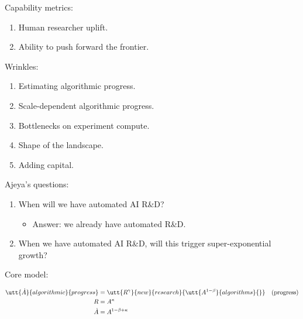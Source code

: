\documentclass[
  11pt,
  letterpaper,
  DIV=11,
  numbers=noendperiod]{scrartcl}
\providecommand{\tightlist}{%
  \setlength{\itemsep}{0pt}\setlength{\parskip}{0pt}}
\begin{document}
Capability metrics:

\begin{enumerate}
\def\labelenumi{\arabic{enumi}.}
\tightlist
\item
  Human researcher uplift.
\item
  Ability to push forward the frontier.
\end{enumerate}

Wrinkles:

\begin{enumerate}
\def\labelenumi{\arabic{enumi}.}
\tightlist
\item
  Estimating algorithmic progress.
\item
  Scale-dependent algorithmic progress.
\item
  Bottlenecks on experiment compute.
\item
  Shape of the landscape.
\item
  Adding capital.
\end{enumerate}

Ajeya's questions:

\begin{enumerate}
\def\labelenumi{\arabic{enumi}.}
\tightlist
\item
  When will we have automated AI R\&D?

  \begin{itemize}
  \tightlist
  \item
    Answer: we already have automated R\&D.
  \end{itemize}
\item
  When we have automated AI R\&D, will this trigger super-exponential
  growth?
\end{enumerate}

Core model:

\[\begin{aligned}
    \utt{\dot{A}}{algorithmic}{progress}
        &=\utt{R^{\gamma}}{new}{research}
            {\utt{A^{1-\beta}}{algorithms}{}}
        && \text{(progress)}\\
    R&=A^{\kappa}
        && \text{}\\
    \dot{A}&=A^{1-\beta+\kappa}\\
\end{aligned}
\]
\end{document}
